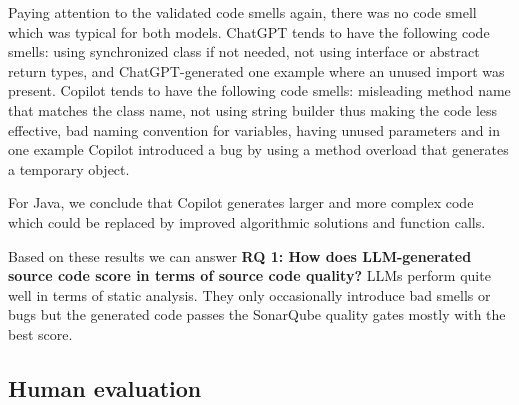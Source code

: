Paying attention to the validated code smells again, there was no code smell which was typical for both models.
ChatGPT tends to have the following code smells: using synchronized class if not needed, not using interface or abstract return types, and ChatGPT-generated one example where an unused import was present.
Copilot tends to have the following code smells: misleading method name that matches the class name, not using string builder thus making the code less effective, bad naming convention for variables, having unused parameters and in one example Copilot introduced a bug by using a method overload that generates a temporary object.

For Java, we conclude that Copilot generates larger and more complex code which could be replaced by improved algorithmic solutions and function calls.

Based on these results we can answer \textbf{RQ 1: How does LLM-generated source code score in terms of source code quality?}
LLMs perform quite well in terms of static analysis.
They only occasionally introduce bad smells or bugs but the generated code passes the SonarQube quality gates mostly with the best score.
\vspace{-13px}
\subsection{Human evaluation}
\label{eval_reviews}

